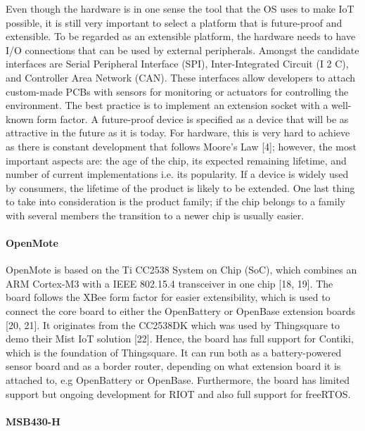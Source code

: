 Even though the hardware is in one sense the tool that the OS uses to make IoT possible,
	it is still very important to select a platform that is future-proof and extensible.
To be regarded as an extensible platform,
	the hardware needs to have I/O connections that can be used by external peripherals.
Amongst the candidate interfaces are Serial Peripheral Interface (SPI),
	Inter-Integrated Circuit (I 2 C),
	and Controller Area Network (CAN).
These interfaces allow developers to attach custom-made PCBs with sensors for monitoring or actuators for controlling the environment.
The best practice is to implement an extension socket with a well-known form factor.
A future-proof device is specified as a device that will be as attractive in the future as it is today.
For hardware,
	this is very hard to achieve as there is constant development that follows Moore’s Law [4];
	however,
	the most important aspects are:
	the age of the chip,
	its expected remaining lifetime,
	and number of current implementations i.e.
its popularity.
If a device is widely used by consumers,
	the lifetime of the product is likely to be extended.
One last thing to take into consideration is the product family;
	if the chip belongs to a family with several members the transition to a newer chip is usually easier.

\paragraph{OpenMote}

OpenMote is based on the Ti CC2538 System on Chip (SoC),
	which combines an ARM Cortex-M3 with a IEEE 802.15.4 transceiver in one chip [18, 19].
The board follows the XBee form factor for easier extensibility,
	which is used to connect the core board to either the OpenBattery or OpenBase extension boards [20, 21].
It originates from the CC2538DK which was used by Thingsquare to demo their Mist IoT solution [22].
Hence,
	the board has full support for Contiki,
	which is the foundation of Thingsquare.
It can run both as a battery-powered sensor board and as a border router,
	depending on what extension board it is attached to,
	e.g OpenBattery or OpenBase.
Furthermore,
	the board has limited support but ongoing development for RIOT and also full support for freeRTOS.

\paragraph{MSB430-H}


